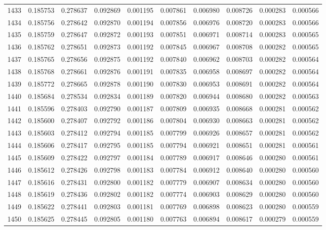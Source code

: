 \begin{tabular}{lrrrrrrrrr}
1433 & 0.185753 & 0.278637 & 0.092869 & 0.001195 & 0.007861 & 0.006980 & 0.008726 & 0.000283 & 0.000566 \\
1434 & 0.185756 & 0.278642 & 0.092870 & 0.001194 & 0.007856 & 0.006976 & 0.008720 & 0.000283 & 0.000566 \\
1435 & 0.185759 & 0.278647 & 0.092872 & 0.001193 & 0.007851 & 0.006971 & 0.008714 & 0.000283 & 0.000565 \\
1436 & 0.185762 & 0.278651 & 0.092873 & 0.001192 & 0.007845 & 0.006967 & 0.008708 & 0.000282 & 0.000565 \\
1437 & 0.185765 & 0.278656 & 0.092875 & 0.001192 & 0.007840 & 0.006962 & 0.008703 & 0.000282 & 0.000564 \\
1438 & 0.185768 & 0.278661 & 0.092876 & 0.001191 & 0.007835 & 0.006958 & 0.008697 & 0.000282 & 0.000564 \\
1439 & 0.185772 & 0.278665 & 0.092878 & 0.001190 & 0.007830 & 0.006953 & 0.008691 & 0.000282 & 0.000564 \\
1440 & 0.185684 & 0.278534 & 0.092834 & 0.001189 & 0.007820 & 0.006944 & 0.008680 & 0.000282 & 0.000563 \\
1441 & 0.185596 & 0.278403 & 0.092790 & 0.001187 & 0.007809 & 0.006935 & 0.008668 & 0.000281 & 0.000562 \\
1442 & 0.185600 & 0.278407 & 0.092792 & 0.001186 & 0.007804 & 0.006930 & 0.008663 & 0.000281 & 0.000562 \\
1443 & 0.185603 & 0.278412 & 0.092794 & 0.001185 & 0.007799 & 0.006926 & 0.008657 & 0.000281 & 0.000562 \\
1444 & 0.185606 & 0.278417 & 0.092795 & 0.001185 & 0.007794 & 0.006921 & 0.008651 & 0.000281 & 0.000561 \\
1445 & 0.185609 & 0.278422 & 0.092797 & 0.001184 & 0.007789 & 0.006917 & 0.008646 & 0.000280 & 0.000561 \\
1446 & 0.185612 & 0.278426 & 0.092798 & 0.001183 & 0.007784 & 0.006912 & 0.008640 & 0.000280 & 0.000560 \\
1447 & 0.185616 & 0.278431 & 0.092800 & 0.001182 & 0.007779 & 0.006907 & 0.008634 & 0.000280 & 0.000560 \\
1448 & 0.185619 & 0.278436 & 0.092802 & 0.001182 & 0.007774 & 0.006903 & 0.008629 & 0.000280 & 0.000560 \\
1449 & 0.185622 & 0.278441 & 0.092803 & 0.001181 & 0.007769 & 0.006898 & 0.008623 & 0.000280 & 0.000559 \\
1450 & 0.185625 & 0.278445 & 0.092805 & 0.001180 & 0.007763 & 0.006894 & 0.008617 & 0.000279 & 0.000559 \\

\end{tabular}
